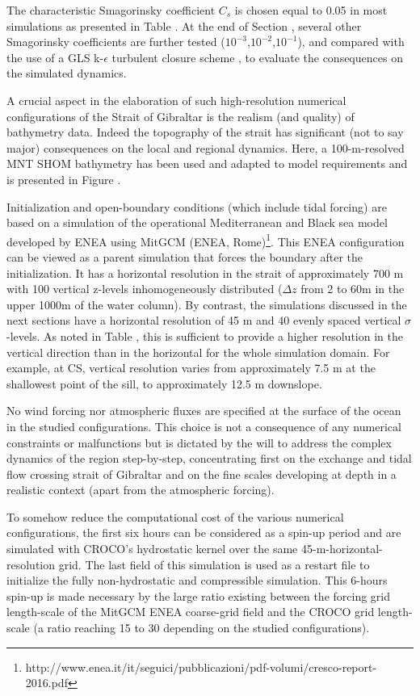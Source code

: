 The characteristic Smagorinsky coefficient $C_s$ is chosen equal to 0.05 in most simulations as presented in Table . At the end of Section , several other Smagorinsky coefficients are further tested  ($10^{-3}$,$10^{-2}$,$10^{-1}$), and compared with the use of a GLS k-$\epsilon$ turbulent closure scheme \citep{umlauf_2003}, to evaluate the consequences on the simulated dynamics.

A crucial aspect in the elaboration of such high-resolution numerical configurations of the Strait of Gibraltar is the realism (and quality) of bathymetry data. Indeed the topography of the strait has significant (not to say major) consequences on the local and regional dynamics. Here, a 100-m-resolved MNT SHOM bathymetry has been used and adapted to model requirements and is presented in Figure .

Initialization and open-boundary conditions (which include tidal forcing) are based on a simulation of the operational Mediterranean and Black sea model developed by ENEA using MitGCM (ENEA, Rome)\footnote{http://www.enea.it/it/seguici/pubblicazioni/pdf-volumi/cresco-report-2016.pdf}. This ENEA configuration can be viewed as a parent simulation that forces the boundary after the initialization. It has a horizontal resolution in the strait of approximately 700 m with 100 vertical z-levels inhomogeneously distributed ($\Delta z$ from 2 to 60m in the upper 1000m of the water column). By contrast, the simulations discussed in the next sections have a horizontal resolution of 45 m and 40 evenly spaced vertical $\sigma$-levels. As noted in Table , this is sufficient to provide a higher resolution in the vertical direction than in the horizontal for the whole simulation domain. For example, at CS, vertical resolution varies from approximately 7.5 m at the shallowest point of the sill, to approximately 12.5 m downslope.

No wind forcing nor atmospheric fluxes are specified at the surface of the ocean in the studied configurations. This choice is not a consequence of any numerical constraints or malfunctions but is dictated by the will to address the complex dynamics of the region step-by-step, concentrating first on the exchange and tidal flow crossing strait of Gibraltar and on the fine scales developing at depth in a realistic context (apart from the atmospheric forcing).

To somehow reduce the computational cost of the various numerical configurations, the first six hours can be considered as a spin-up period and are simulated with CROCO's hydrostatic kernel over the same 45-m-horizontal-resolution grid. The last field of this simulation is used as a restart file to initialize the fully non-hydrostatic and compressible simulation. This 6-hours spin-up is made necessary by the large ratio existing between the forcing grid length-scale of the MitGCM ENEA coarse-grid field and the CROCO grid length-scale (a ratio reaching 15 to 30 depending on the studied configurations). 

